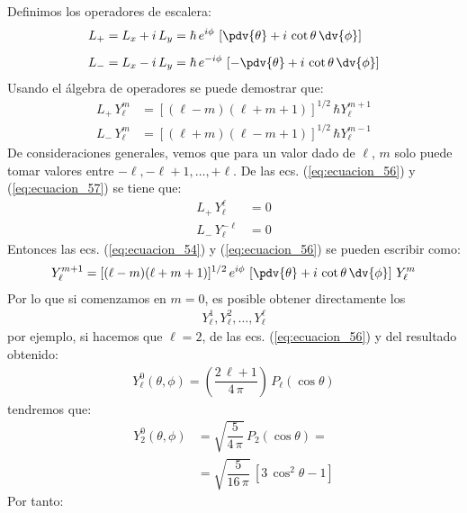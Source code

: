 Definimos los operadores de escalera:
\begin{align}
L_{+} &= L_{x} + i \, L_{y} = \hbar \, e^{i \phi} \, \left[ \pdv{\theta} + i \, \cot \theta \, \dv{\phi} \right] \label{eq:ecuacion_54} \\[0.5em]
L_{-} &= L_{x} - i \, L_{y} = \hbar \, e^{-i \phi} \, \left[ - \pdv{\theta} + i \, \cot \theta \, \dv{\phi} \right] \label{eq:ecuacion_55}
\end{align}
Usando el álgebra de operadores se puede demostrar que:
\begin{align}
L_{+} \, Y_{\ell}^{m} &= [(\ell - m)(\ell + m + 1)]^{1/2} \, \hbar Y_{\ell}^{m+1} \label{eq:ecuacion_56} \\[0.5em]
L_{-} \, Y_{\ell}^{m} &= [(\ell + m)(\ell - m + 1)]^{1/2} \, \hbar Y_{\ell}^{m-1} \label{eq:ecuacion_57}
\end{align}
De consideraciones generales, vemos que para un valor dado de $\ell$, $m$ solo puede tomar valores entre $-\ell, -\ell + 1, \ldots, + \ell$. De las ecs. (\ref{eq:ecuacion_56}) y (\ref{eq:ecuacion_57}) se tiene que:
\begin{align}
L_{+} \, Y_{\ell}^{\ell} &= 0 \\[0.5em]
L_{-} \, Y_{\ell}^{-\ell} &= 0
\end{align}
Entonces las ecs. (\ref{eq:ecuacion_54}) y (\ref{eq:ecuacion_56})  se pueden escribir como:
\begin{align}
Y_{\ell}^{m+1} = [(\ell - m)(\ell + m + 1)]^{1/2} \, e^{i \phi} \, \left[ \pdv{\theta} + i \, \cot \theta \, \dv{\phi} \right] \, Y_{\ell}^{m}
\label{eq:ecuacion_60}
\end{align}
Por lo que si comenzamos en $m = 0$, es posible obtener directamente los
\begin{align*}
Y_{\ell}^{1}, Y_{\ell}^{2}, \ldots, Y_{\ell}^{\ell}
\end{align*}
por ejemplo, si hacemos que $\ell =  2$, de las ecs. (\ref{eq:ecuacion_56}) y del resultado obtenido:
\begin{align}
Y_{\ell}^{0} (\theta, \phi) = \left( \dfrac{2 \, \ell + 1}{4 \, \pi} \right) \, P_{\ell} (\cos \theta)
\label{eq:ecuacion_52}
\end{align} 
tendremos que:
\begin{align}
Y_{2}^{0} (\theta, \phi) &= \sqrt{\dfrac{5}{4 \, \pi}} \, P_{2} (\cos \theta) = \\[0.5em]
&= \sqrt{\dfrac{5}{16 \, \pi}} \, [3 \, \cos^{2} \theta - 1] \label{eq:ecuacion_61}
\end{align}
Por tanto:
